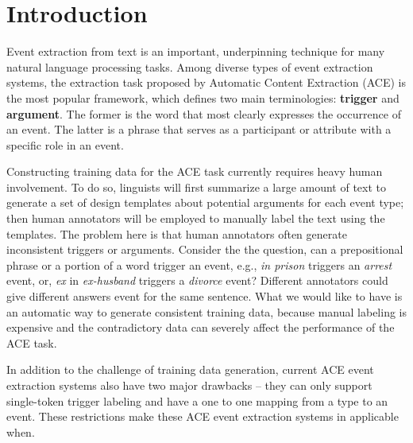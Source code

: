 \section{Introduction}
Event extraction from text is an important, underpinning technique for many natural language processing tasks.
Among diverse types of event extraction systems, the extraction task proposed by Automatic Content Extraction (ACE)
\cite{doddington2004automatic} is the most popular framework, which defines two main terminologies: \textbf{trigger}
and \textbf{argument}. The former is the word that most clearly expresses the occurrence of an event. The latter is a
phrase that serves as a participant or attribute with a specific role in an event.

Constructing training data for the ACE task currently requires heavy human involvement. To do so, linguists will first
summarize a large amount of text to generate a set of design templates about potential arguments for each event type;
then human annotators will be employed to manually label the text using the templates. The problem here is that human
annotators often generate inconsistent triggers or arguments. Consider the the question, can a prepositional phrase or
a portion of a word trigger an event, e.g., \textit{in prison} triggers an \emph{arrest} event, or, \textit{ex} in
\textit{ex-husband} triggers a \emph{divorce} event? Different annotators could give different answers event for the
same sentence. What we would like to have is an automatic way to generate consistent training data, because manual labeling is
expensive and
the contradictory data can severely affect the performance of the ACE task.  

In addition to the challenge of training data generation, current ACE event extraction systems
also have two major drawbacks -- they can only support single-token trigger labeling and have
a one to one mapping from a type to an event. These restrictions make these ACE event extraction
systems in applicable when. 



